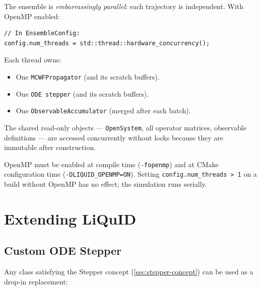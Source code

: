 \documentclass[11pt,a4paper,twoside]{book}
\newcommand{\code}[1]{\texttt{\small#1}}
\theoremstyle{definition}
\theoremstyle{remark}
\begin{document}
The ensemble is \emph{embarrassingly parallel}: each trajectory is
independent. With OpenMP enabled:

\begin{verbatim}
// In EnsembleConfig:
config.num_threads = std::thread::hardware_concurrency();
\end{verbatim}

Each thread owns:
\begin{itemize}
  \item One \code{MCWFPropagator} (and its scratch buffers).
  \item One \code{ODE stepper} (and its scratch buffers).
  \item One \code{ObservableAccumulator} (merged after each batch).
\end{itemize}

The shared read-only objects — \code{OpenSystem}, all operator matrices,
observable definitions — are accessed concurrently without locks because
they are immutable after construction.

\begin{warnbox}
  OpenMP must be enabled at compile time (\code{-fopenmp}) and at
  CMake configuration time (\code{-DLIQUID\_OPENMP=ON}).
  Setting \code{config.num\_threads > 1} on a build without OpenMP
  has no effect; the simulation runs serially.
\end{warnbox}

\chapter{Extending LiQuID}
\label{chap:extending}

\section{Custom ODE Stepper}
\label{sec:custom-stepper}

Any class satisfying the Stepper concept (\cref{sec:stepper-concept})
can be used as a drop-in replacement:
\end{document}
